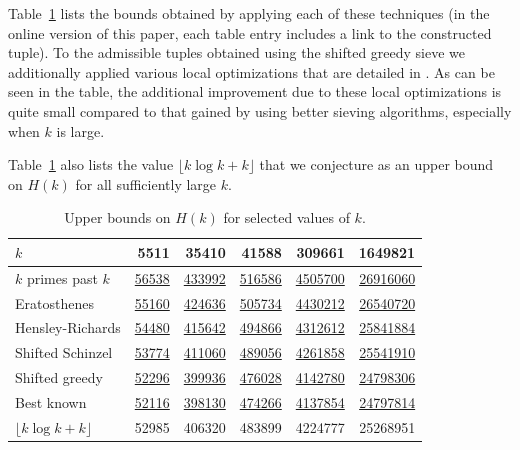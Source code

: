 \documentclass{bmcart}
\newcommand*\tupref[2]{\href{http://math.mit.edu/~primegaps/tuples/admissible_#1_#2.txt}{\num{#2}}}
\theoremstyle{plain}
\theoremstyle{definition}
\begin{document}
Table~\ref{kmidtable} lists the bounds obtained by applying each of these techniques (in the online version of this paper, each table entry includes a link to the constructed tuple).
To the admissible tuples obtained using the shifted greedy sieve we additionally applied various local optimizations that are detailed in \cite[\S 3.6]{polymath8a}.
As can be seen in the table, the additional improvement due to these local optimizations is quite small compared to that gained by using better sieving algorithms, especially when $k$ is large.

Table~\ref{kmidtable} also lists the value $\lfloor k\log k+k\rfloor$ that we conjecture as an upper bound on $H(k)$ for all sufficiently large $k$.

\begin{table}
\centering
\setlength{\extrarowheight}{2pt}
\caption{Upper bounds on $H(k)$ for selected values of $k$.}\label{kmidtable}
\begin{tabular}{lrrrrr}
\toprule
$k$                 & \num{5511}         & \num{35410}          & \num{41588}           & \num{309661}           & \num{1649821}\\
\midrule
$k$ primes past $k$ & \tupref{5511}{56538} & \tupref{35410}{433992} & \tupref{41588}{516586} & \tupref{309661}{4505700} & \tupref{1649821}{26916060} \\
Eratosthenes        & \tupref{5511}{55160} & \tupref{35410}{424636} & \tupref{41588}{505734} & \tupref{309661}{4430212} & \tupref{1649821}{26540720} \\
Hensley-Richards           & \tupref{5511}{54480} & \tupref{35410}{415642} & \tupref{41588}{494866} & \tupref{309661}{4312612} & \tupref{1649821}{25841884} \\
Shifted Schinzel    & \tupref{5511}{53774} & \tupref{35410}{411060} & \tupref{41588}{489056} & \tupref{309661}{4261858} & \tupref{1649821}{25541910} \\
Shifted greedy      & \tupref{5511}{52296} & \tupref{35410}{399936} & \tupref{41588}{476028} & \tupref{309661}{4142780} & \tupref{1649821}{24798306} \\
Best known          & \tupref{5511}{52116} & \tupref{35410}{398130} & \tupref{41588}{474266} & \tupref{309661}{4137854} & \tupref{1649821}{24797814} \\
\midrule
$\lfloor k\log k + k \rfloor$       & \num{52985}         & \num{406320}          & \num{483899}          & \num{4224777}           & \num{25268951} \\
\bottomrule
\end{tabular}
\end{table}
\end{document}
